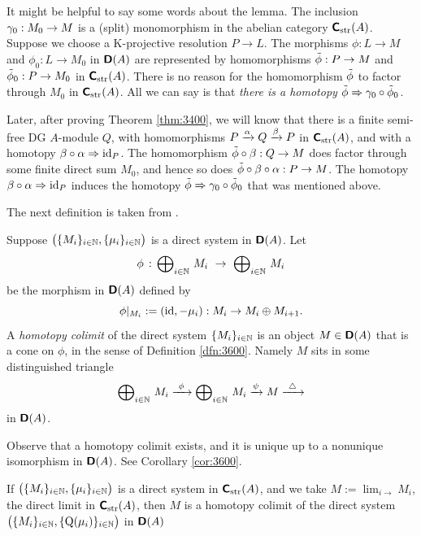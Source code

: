 \begin{rem} \label{rem:3405}
It might be helpful to say some words about the lemma. 
The inclusion $\gamma_0 : M_0 \to M$ is a (split) monomorphism
in the abelian category $\boldsymbol{\mathsf{C}}_{\mathrm{str}}(A)$. Suppose we choose a 
K-projective resolution $P \to L$. The morphisms $\phi : L \to M$
and $\phi_0 : L \to M_0$ in $\boldsymbol{\mathsf{D}}(A)$ are represented by 
homomorphisms 
$\tilde{\phi} : P \to M$ and $\tilde{\phi}_0 : P \to M_0$
in $\boldsymbol{\mathsf{C}}_{\mathrm{str}}(A)$. 
There is no reason for the homomorphism $\tilde{\phi}$ to factor through $M_0$
in $\boldsymbol{\mathsf{C}}_{\mathrm{str}}(A)$. 
All we can say is that {\em there is a homotopy}
$\tilde{\phi} \Rightarrow \gamma_0 \circ \tilde{\phi}_0$. 

Later, after proving Theorem \ref{thm:3400}, we will know that there is a 
finite semi-free DG $A$-module $Q$, with homomorphisms 
$P \xrightarrow{\alpha} Q \xrightarrow{\beta} P$ in $\boldsymbol{\mathsf{C}}_{\mathrm{str}}(A)$,
and with a homotopy 
$\beta \circ \alpha \Rightarrow \operatorname{id}_P$.  
The homomorphism 
$\tilde{\phi} \circ \beta : Q \to M$
does factor through some finite direct sum $M_0$, and hence so does 
$\tilde{\phi} \circ \beta \circ \alpha : P \to M$. 
The homotopy $\beta \circ \alpha \Rightarrow \operatorname{id}_P$
induces the homotopy $\tilde{\phi} \Rightarrow \gamma_0 \circ \tilde{\phi}_0$
that was mentioned above. 
\end{rem}

The next definition is taken from \cite{BoNe}. 

\begin{dfn} \label{dfn:3410}
Suppose 
$\bigl( \{ M_i \}_{i \in \mathbb{N}}, \{ \mu_i \}_{i \in \mathbb{N}} \bigr)$ 
is a direct system in $\boldsymbol{\mathsf{D}}(A)$. Let 
\[ \phi \, : \, \bigoplus\nolimits_{i \in \N} \, M_i \ \to \ 
\bigoplus\nolimits_{i \in \N} \, M_i \]
be the morphism in $\boldsymbol{\mathsf{D}}(A)$ defined by 
\[ \phi|_{M_i} := (\operatorname{id}, -\mu_i) : M_i \to M_i \oplus M_{i + 1} . \]
A {\em homotopy colimit} 
of the direct system $\{ M_i \}_{i \in \mathbb{N}}$
is an object $M \in \boldsymbol{\mathsf{D}}(A)$ that is a cone on $\phi$, in the sense of 
Definition \ref{dfn:3600}. Namely $M$ sits in some distinguished triangle 
\[ \bigoplus\nolimits_{i \in \mathbb{N}} \, M_i \xrightarrow{\ \phi \ } 
\bigoplus\nolimits_{i \in \mathbb{N}} \, M_i 
\xrightarrow{\psi} M \xrightarrow{\ \triangle \ } \]
in $\boldsymbol{\mathsf{D}}(A)$.
\end{dfn}

Observe that a homotopy colimit exists, and it is unique up to a 
non\-unique isomorphism in $\boldsymbol{\mathsf{D}}(A)$. See Corollary \ref{cor:3600}.

\begin{lem} \label{lem:3610}
If 
$\bigl( \{ M_i \}_{i \in \mathbb{N}}, \{ \mu_i \}_{i \in \mathbb{N}} \bigr)$
is a direct system in $\boldsymbol{\mathsf{C}}_{\mathrm{str}}(A)$, and we take 
$M := \lim_{i \to} M_i$,
the direct limit in $\boldsymbol{\mathsf{C}}_{\mathrm{str}}(A)$, then $M$ is a 
homotopy colimit of the direct system 
$\bigl( \{ M_i \}_{i \in \mathbb{N}}, \{ \operatorname{Q}(\mu_i) \}_{i \in \mathbb{N}} \bigr)$ 
in $\boldsymbol{\mathsf{D}}(A)$
\end{lem}

